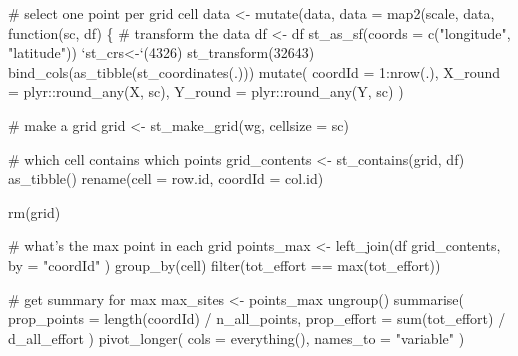 \documentclass[]{article}
\newenvironment{Shaded}{}{}
\newcommand{\CommentTok}[1]{\textcolor[rgb]{0.00,0.50,0.00}{#1}}
\newcommand{\ControlFlowTok}[1]{\textcolor[rgb]{0.00,0.00,1.00}{#1}}
\newcommand{\DataTypeTok}[1]{#1}
\newcommand{\DecValTok}[1]{#1}
\newcommand{\KeywordTok}[1]{\textcolor[rgb]{0.00,0.00,1.00}{#1}}
\newcommand{\NormalTok}[1]{#1}
\newcommand{\OperatorTok}[1]{#1}
\newcommand{\StringTok}[1]{\textcolor[rgb]{0.00,0.50,0.50}{#1}}
\begin{document}
\begin{Shaded}
\begin{Highlighting}[numbers=left,,]
{{{{{\CommentTok{# select one point per grid cell}
\NormalTok{data <-}\StringTok{ }\KeywordTok{mutate}\NormalTok{(data, }\DataTypeTok{data =} \KeywordTok{map2}\NormalTok{(scale, data, }\ControlFlowTok{function}\NormalTok{(sc, df) \{}
  \CommentTok{# transform the data}
\NormalTok{  df <-}\StringTok{ }\NormalTok{df }\OperatorTok{%
\StringTok{    }\KeywordTok{st_as_sf}\NormalTok{(}\DataTypeTok{coords =} \KeywordTok{c}\NormalTok{(}\StringTok{"longitude"}\NormalTok{, }\StringTok{"latitude"}\NormalTok{)) }\OperatorTok{%
\StringTok{    `}\DataTypeTok{st_crs<-}\StringTok{`}\NormalTok{(}\DecValTok{4326}\NormalTok{) }\OperatorTok{%
\StringTok{    }\KeywordTok{st_transform}\NormalTok{(}\DecValTok{32643}\NormalTok{) }\OperatorTok{%
\StringTok{    }\KeywordTok{bind_cols}\NormalTok{(}\KeywordTok{as_tibble}\NormalTok{(}\KeywordTok{st_coordinates}\NormalTok{(.))) }\OperatorTok{%
\StringTok{    }\KeywordTok{mutate}\NormalTok{(}
      \DataTypeTok{coordId =} \DecValTok{1}\OperatorTok{:}\KeywordTok{nrow}\NormalTok{(.),}
      \DataTypeTok{X_round =}\NormalTok{ plyr}\OperatorTok{::}\KeywordTok{round_any}\NormalTok{(X, sc),}
      \DataTypeTok{Y_round =}\NormalTok{ plyr}\OperatorTok{::}\KeywordTok{round_any}\NormalTok{(Y, sc)}
\NormalTok{    )}

  \CommentTok{# make a grid}
\NormalTok{  grid <-}\StringTok{ }\KeywordTok{st_make_grid}\NormalTok{(wg, }\DataTypeTok{cellsize =}\NormalTok{ sc)}

  \CommentTok{# which cell contains which points}
\NormalTok{  grid_contents <-}\StringTok{ }\KeywordTok{st_contains}\NormalTok{(grid, df) }\OperatorTok{%
\StringTok{    }\KeywordTok{as_tibble}\NormalTok{() }\OperatorTok{%
\StringTok{    }\KeywordTok{rename}\NormalTok{(}\DataTypeTok{cell =}\NormalTok{ row.id, }\DataTypeTok{coordId =}\NormalTok{ col.id)}

  \KeywordTok{rm}\NormalTok{(grid)}

  \CommentTok{# what's the max point in each grid}
\NormalTok{  points_max <-}\StringTok{ }\KeywordTok{left_join}\NormalTok{(df }\OperatorTok{%
\NormalTok{    grid_contents,}
    \DataTypeTok{by =} \StringTok{"coordId"}
\NormalTok{  ) }\OperatorTok{%
\StringTok{    }\KeywordTok{group_by}\NormalTok{(cell) }\OperatorTok{%
\StringTok{    }\KeywordTok{filter}\NormalTok{(tot_effort }\OperatorTok{==}\StringTok{ }\KeywordTok{max}\NormalTok{(tot_effort))}

  \CommentTok{# get summary for max}
\NormalTok{  max_sites <-}\StringTok{ }\NormalTok{points_max }\OperatorTok{%
\StringTok{    }\KeywordTok{ungroup}\NormalTok{() }\OperatorTok{%
\StringTok{    }\KeywordTok{summarise}\NormalTok{(}
      \DataTypeTok{prop_points =} \KeywordTok{length}\NormalTok{(coordId) }\OperatorTok{/}\StringTok{ }\NormalTok{n_all_points,}
      \DataTypeTok{prop_effort =} \KeywordTok{sum}\NormalTok{(tot_effort) }\OperatorTok{/}\StringTok{ }\NormalTok{d_all_effort}
\NormalTok{    ) }\OperatorTok{%
\StringTok{    }\KeywordTok{pivot_longer}\NormalTok{(}
      \DataTypeTok{cols =} \KeywordTok{everything}\NormalTok{(),}
      \DataTypeTok{names_to =} \StringTok{"variable"}
\NormalTok{    )}

}}}}}}}}}}}}}}}}}}
\end{Highlighting}
\end{Shaded}
\end{document}
